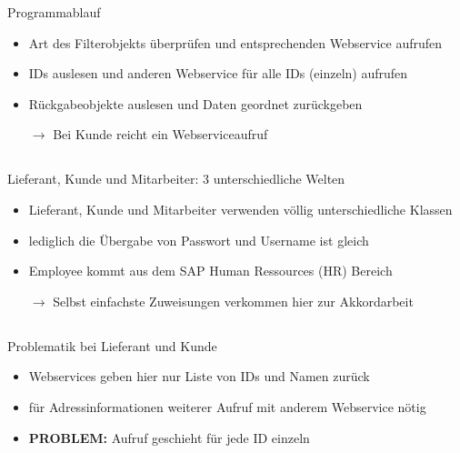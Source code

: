 \documentclass[xcolor={usenames,dvipsnames}, compress, 10pt]{beamer}
\begin{document}
\begin{frame}{Programmablauf}
\begin{center}

\begin{itemize}
\item Art des Filterobjekts überprüfen und entsprechenden Webservice aufrufen
\item IDs auslesen und anderen Webservice für alle IDs (einzeln) aufrufen
\item Rückgabeobjekte auslesen und Daten geordnet zurückgeben
\item[$\rightarrow$]Bei Kunde reicht ein Webserviceaufruf
\end{itemize}

\end{center}
\end{frame}

\subsection*{}

\begin{frame}{Lieferant, Kunde und Mitarbeiter: 3 unterschiedliche Welten}
\begin{center}

\begin{itemize}
\item Lieferant, Kunde und Mitarbeiter verwenden völlig unterschiedliche Klassen
\item lediglich die Übergabe von Passwort und Username ist gleich
\item Employee kommt aus dem SAP Human Ressources (HR) Bereich
\item [$\rightarrow$]Selbst einfachste Zuweisungen verkommen hier zur Akkordarbeit
\end{itemize}

\end{center}
\end{frame}

\subsection*{}

\begin{frame}{Problematik bei Lieferant und Kunde}
\begin{center}

\begin{itemize}
\item Webservices geben hier nur Liste von IDs und Namen zurück
\item für Adressinformationen weiterer Aufruf mit anderem Webservice nötig
\item \textbf{PROBLEM: } Aufruf geschieht für jede ID einzeln
\end{itemize}

\end{center}
\end{frame}
\end{document}
